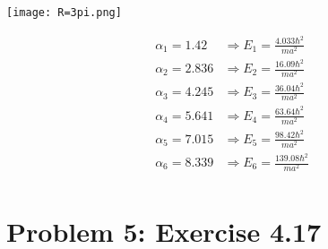 \documentclass{article}
\begin{document}
\begin{enumerate}
		\begin{minipage}{0.55\textwidth}
			\centering
			\texttt{[image: R=3pi.png]}
		\end{minipage}
		\begin{minipage}{0.35\textwidth}
			\begin{equation}
				\begin{split}
					\alpha_1 = 1.42 &\Rightarrow E_1 = \frac{4.033\hbar^2}{ma^2} \\
					\alpha_2 = 2.836 &\Rightarrow E_2 = \frac{16.09\hbar^2}{ma^2} \\
					\alpha_3 = 4.245 &\Rightarrow E_3 = \frac{36.04\hbar^2}{ma^2} \\
					\alpha_4 = 5.641 &\Rightarrow E_4 = \frac{63.64\hbar^2}{ma^2} \\
					\alpha_5 = 7.015 &\Rightarrow E_5 = \frac{98.42\hbar^2}{ma^2} \\
					\alpha_6 = 8.339 &\Rightarrow E_6 = \frac{139.08\hbar^2}{ma^2} \\
				\end{split}
			\end{equation}
		\end{minipage}		
		
		
	\end{enumerate}

\clearpage
	
	\section*{Problem 5: Exercise 4.17}
	
\end{document}
